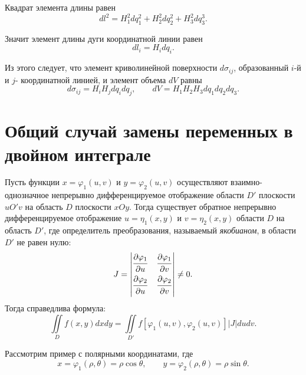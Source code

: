 \documentclass[a4paper,12pt,oneside]{extbook}
\theoremstyle{numbered}
\theoremstyle{unnumbered}
\theoremstyle{named}
\theoremstyle{unnumbered}
\theoremstyle{named}
\theoremstyle{named}
\theoremstyle{named}
\begin{document}
Квадрат элемента длины равен
\begin{equation}
    dl^2 = H_1^2 dq_1^2 + H_2^2 dq_2^2 + H_3^2 dq_3^3.
\end{equation}

Значит элемент длины дуги координатной линии равен
\begin{equation}
    dl_i = H_i dq_i.
\end{equation}

Из этого следует, что элемент криволинейной поверхности \(d\sigma_{ij}\), образованный \(i\)-й и \(j\)- координатной линией, и элемент объема \(dV\) равны
\begin{equation}
    d\sigma_{ij} = H_i H_j dq_i dq_j,
    \qquad
    dV = H_1 H_2 H_3 dq_1 dq_2 dq_3.
\end{equation}

\section{Общий случай замены переменных в двойном интеграле}
\label{sec:Общий случай замены переменных в двойном интеграле}

Пусть функции \(x = \varphi_1(u, v)\) и \(y = \varphi_2(u, v)\) осуществляют взаимно-однозначное непрерывно дифференцируемое отображение области \(D'\) плоскости \(uO'v\) на область \(D\) плоскости \(xOy\). Тогда существует обратное непрерывно дифференцируемое отображение \(u = \eta_1(x, y)\) и \(v = \eta_2(x, y)\) области \(D\) на область \(D'\), где определитель преобразования, называемый \textit{якобианом}, в области \(D'\) не равен нулю:
\begin{equation}
    J =
    \begin{vmatrix}
        \dfrac{\strut \partial \varphi_1}{\strut \partial u} & \dfrac{\strut \partial \varphi_1}{\strut \partial v} \\
        \dfrac{\strut \partial \varphi_2}{\strut \partial u} & \dfrac{\strut \partial \varphi_2}{\strut \partial v}
    \end{vmatrix}
    \neq 0.
\end{equation}
Тогда справедлива формула:
\begin{equation}
    \iint\limits_{D} f(x, y) dxdy = \iint\limits_{D'} f [\varphi_1(u, v), \varphi_2(u, v)] |J|dudv.
\end{equation}

Рассмотрим пример с полярными координатами, где
\begin{equation}
    x = \varphi_1(\rho, \theta) = \rho \cos \theta,
    \qquad
    y = \varphi_2(\rho, \theta) = \rho \sin \theta.
\end{equation}
\end{document}
